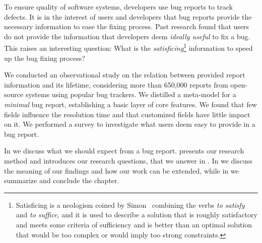 

%

%

\newcommand{\RQ}[2]{%
\refstepcounter{RQCounter} \label{#1}
 \begin{framed}
   \textbf{RQ\arabic{RQCounter}.}~#2
\end{framed}
}




To ensure quality of software systems, developers use bug reports to track defects.
It is in the interest of users and developers that bug reports provide the necessary information to ease the fixing process.
Past research found that users do not provide the information that developers deem \emph{ideally useful} to fix a bug.
This raises an interesting question: What is the \emph{satisficing}\footnote{Satisficing is a neologism coined by Simon~\cite{Simo57,Simo01} combining the verbs {\em to satisfy} and {\em to suffice}, and it is used to describe a solution that is roughly satisfactory and meets some criteria of sufficiency and is better than an optimal solution that would be too complex or would imply too strong constraints.} information to speed up the bug fixing process?

We conducted an observational study on the relation between provided report information and its lifetime, considering more than 650,000 reports from open-source systems using popular bug trackers.
We distilled a meta-model for a \emph{minimal} bug report, establishing a basic layer of core features.
We found that few fields influence the resolution time and that customized fields have little impact on it.
We performed a survey to investigate what users deem easy to provide in a bug report.

\structure
In  we discuss what we should expect from a bug report.
 presents our research method and introduces our research questions, that we answer in .
In  we discuss the meaning of our findings and how our work can be extended, while in  we summarize and conclude the chapter.

